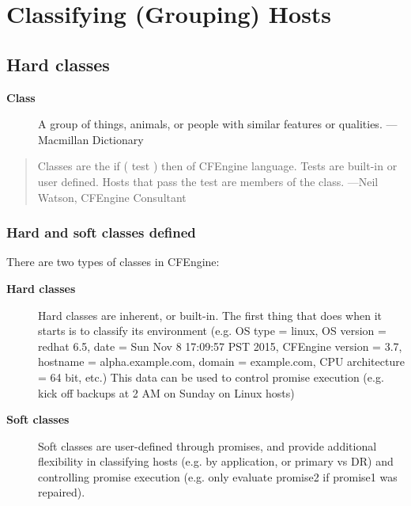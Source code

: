 



\chapter{Classifying (Grouping) Hosts}





\section{Hard classes}





\begin{description}
\item[\textbf{Class}] A group of things, animals, or people with similar features or qualities. ---Macmillan Dictionary
\end{description}

\begin{quote}
Classes are the if ( test ) then of CFEngine language. Tests are built-in
or user defined. Hosts that pass the test are members of the class.
---Neil Watson, CFEngine Consultant
\end{quote}





\subsection{Hard and soft classes defined}

There are two types of classes in CFEngine:

\begin{description}
\item[\textbf{Hard classes}] Hard classes are inherent, or built-in. The first thing that 
does when it starts is to classify its environment (e.g.  OS type = linux,
OS version = redhat 6.5, date = Sun Nov  8 17:09:57 PST 2015, CFEngine
version = 3.7, hostname = alpha.example.com, domain = example.com, CPU
architecture = 64 bit, etc.)  This data can be used to control promise
execution (e.g. kick off backups at 2 AM on Sunday on Linux hosts)



\item[\textbf{Soft classes}] Soft classes are user-defined through promises, and provide additional
flexibility in classifying hosts (e.g. by application, or primary vs
DR) and controlling promise execution (e.g. only evaluate promise2 if
promise1 was repaired).
\end{description}





